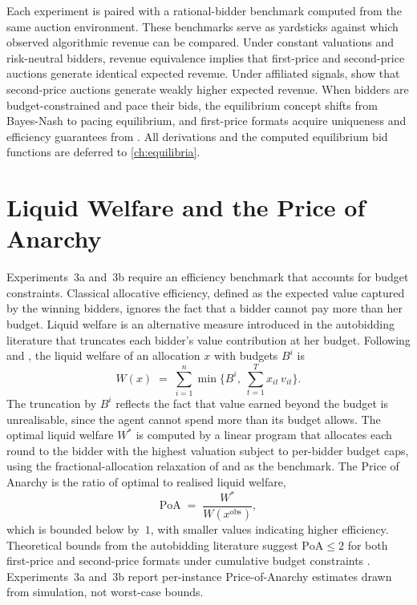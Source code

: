 Each experiment is paired with a rational-bidder benchmark computed from the same auction environment. These benchmarks serve as yardsticks against which observed algorithmic revenue can be compared. Under constant valuations and risk-neutral bidders, revenue equivalence \citep{Vickrey1961} implies that first-price and second-price auctions generate identical expected revenue. Under affiliated signals, \citet{MilgromWeber1982} show that second-price auctions generate weakly higher expected revenue. When bidders are budget-constrained and pace their bids, the equilibrium concept shifts from Bayes-Nash to pacing equilibrium, and first-price formats acquire uniqueness and efficiency guarantees from \citet{Conitzer2022FPPE}. All derivations and the computed equilibrium bid functions are deferred to \cref{ch:equilibria}.

\section{Liquid Welfare and the Price of Anarchy}
\label{sec:welfare}

Experiments~3a and~3b require an efficiency benchmark that accounts for budget constraints. Classical allocative efficiency, defined as the expected value captured by the winning bidders, ignores the fact that a bidder cannot pay more than her budget. Liquid welfare is an alternative measure introduced in the autobidding literature that truncates each bidder's value contribution at her budget. Following \citet{Gaitonde2023} and \citet{Deng2021TowardsEfficient}, the liquid welfare of an allocation $x$ with budgets $B^i$ is
\begin{equation}
W(x) \;=\; \sum_{i = 1}^{n} \min\!\Big\{B^i,\; \sum_{t = 1}^{T} x_{it}\, v_{it}\Big\}.
\label{eq:liquid_welfare}
\end{equation}
The truncation by $B^i$ reflects the fact that value earned beyond the budget is unrealisable, since the agent cannot spend more than its budget allows. The optimal liquid welfare $W^*$ is computed by a linear program that allocates each round to the bidder with the highest valuation subject to per-bidder budget caps, using the fractional-allocation relaxation of \citet{Gaitonde2023} and \citet{Deng2021TowardsEfficient} as the benchmark. The Price of Anarchy is the ratio of optimal to realised liquid welfare,
\begin{equation}
\mathrm{PoA} \;=\; \frac{W^*}{W(x^{\text{obs}})},
\label{eq:poa}
\end{equation}
which is bounded below by~$1$, with smaller values indicating higher efficiency. Theoretical bounds from the autobidding literature suggest $\mathrm{PoA} \leq 2$ for both first-price and second-price formats under cumulative budget constraints \citep{Aggarwal2019, Gaitonde2023}. Experiments~3a and~3b report per-instance Price-of-Anarchy estimates drawn from simulation, not worst-case bounds.

